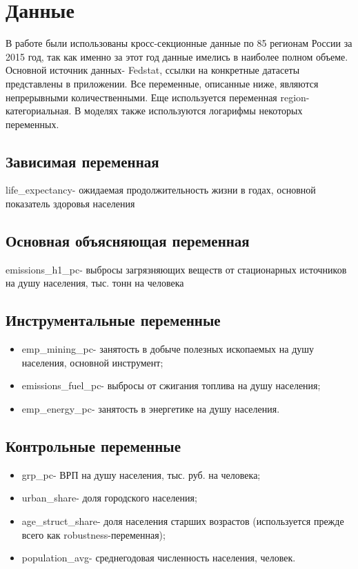 \documentclass[11pt,a4paper]{article}
\begin{document}
\section*{Данные}
В работе были использованы кросс-секционные данные по 85 регионам России за 2015 год, так как именно за этот год данные имелись в наиболее полном объеме. Основной источник данных- Fedstat, ссылки на конкретные датасеты представлены в приложении. Все переменные, описанные ниже, являются непрерывными количественными. Еще используется переменная region- категориальная. В моделях также используются логарифмы некоторых переменных.

\subsection*{Зависимая переменная}
\begin{center}\small life\_expectancy- ожидаемая продолжительность жизни в годах, основной показатель здоровья населения\end{center}
\subsection*{Основная объясняющая переменная}
emissions\_h1\_pc- выбросы загрязняющих веществ от стационарных источников на душу населения, тыс. тонн на человека

\subsection*{Инструментальные переменные}
\begin{itemize}
\item emp\_mining\_pc- занятость в добыче полезных ископаемых на душу населения, основной инструмент;
\item emissions\_fuel\_pc- выбросы от сжигания топлива на душу населения;
\item emp\_energy\_pc- занятость в энергетике на душу населения.
\end{itemize}

\subsection*{Контрольные переменные}
\begin{itemize}
\item grp\_pc- ВРП на душу населения, тыс. руб. на человека;
\item urban\_share- доля городского населения;
\item age\_struct\_share- доля населения старших возрастов (используется прежде всего как robustness-переменная);
\item population\_avg- среднегодовая численность населения, человек.
\end{itemize}
\end{document}
